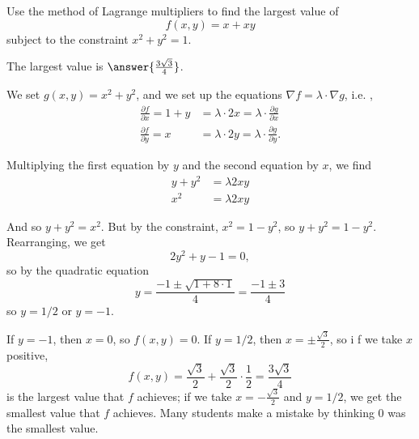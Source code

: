 \documentclass{ximera}
\author{Jim Fowler}
\begin{document}
\begin{exercise}
  Use the method of Lagrange multipliers to find the largest value of 
$$
f(x,y) = x + xy
$$
subject to the constraint $x^2 + y^2 = 1$.

The largest value is $\answer{\frac{3 \sqrt{3}}{4}}$.

\begin{hint}
We set $g(x,y) = x^2 + y^2$, and we set up the equations $\nabla f = \lambda \cdot \nabla g$, i.e.
,
\begin{align*}
\frac{\partial f}{\partial x} = 1 + y &= \lambda \cdot 2x = \lambda \cdot \frac{\partial g}{\partial x}\\
\frac{\partial f}{\partial y} = x &= \lambda \cdot 2y = \lambda \cdot \frac{\partial g}{\partial y
}.
\end{align*}
\end{hint}

\begin{hint}
Multiplying the first equation by $y$ and the second equation by $x$, we find
\begin{align*}
y + y^2 &= \lambda 2xy \\
x^2 &= \lambda 2xy
\end{align*}
\end{hint}

\begin{hint}
And so $y + y^2 = x^2$.  But by the constraint, $x^2 = 1 - y^2$, so $y + y^2 = 1 - y^2$.  Rearranging, we get
$$
2 y^2 + y - 1 = 0,
$$
so by the quadratic equation
$$
y = \frac{-1 \pm \sqrt{1 + 8 \cdot 1}}{4} = \frac{-1 \pm 3}{4}
$$
so $y = 1/2$ or $y = -1$.
\end{hint}

\begin{hint}
If $y = -1$, then $x = 0$, so $f(x,y) = 0$.  If $y = 1/2$, then $x = \pm \frac{\sqrt{3}}{2}$, so i
f we take $x$ positive,
$$
f(x,y) = \frac{\sqrt{3}}{2} + \frac{\sqrt{3}}{2} \cdot \frac{1}{2} = \frac{3 \sqrt{3}}{4}
$$
is the largest value that $f$ achieves; if we take $x =
-\frac{\sqrt{3}}{2}$ and $y = 1/2$, we get the smallest value that $f$
achieves.  Many students make a mistake by thinking $0$ was the
smallest value.
\end{hint}

\end{exercise}
\end{document}

